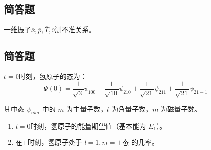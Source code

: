 \subsection{简答题}
一维振子$\overline{x},\overline{p},\overline{T},\overline{v}$测不准关系。
\subsection{简答题}
$t=0$时刻，氢原子的态为：
\[
\Psi(0) = \frac{1}{\sqrt{3}} \psi_{100} + \frac{1}{\sqrt{10}} \psi_{210} + \frac{1}{\sqrt{21}} \psi_{211} + \frac{1}{\sqrt{21}} \psi_{21-1}~
\]

其中态 $\psi_{nlm}$ 中的 $m$ 为主量子数，$l$ 为角量子数，$m$ 为磁量子数。

\begin{enumerate}
    \item $t=0$时刻，氢原子的能量期望值（基本能为 $E_1$）。
    \item 在$\pm$时刻，氢原子处于 $l=1, m=\pm$态 的几率。
\end{enumerate}